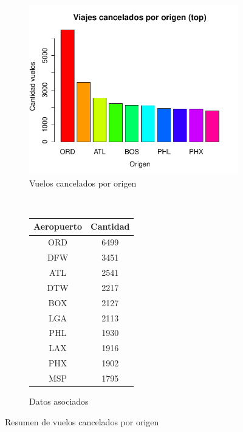 \documentclass[12pt]{article}
\numberwithin{equation}{section}
\numberwithin{table}{section}
\numberwithin{figure}{section}
\begin{document}
\begin{figure}
        \centering
        ~
        \begin{subfigure}[b]{0.6\textwidth}
                \includegraphics[width=1\columnwidth]{imagenes/cancelados/viajes-cancelados-por-origen-top}
                \caption{Vuelos cancelados por origen}
        \end{subfigure}
        ~
        \begin{subfigure}[b]{0.3\textwidth}
                \begin{tabular}{@{}cc@{}}
                  \toprule
                  \textbf{Aeropuerto} & \textbf{Cantidad} \\ \midrule
                  ORD                 & 6499              \\
                  DFW                 & 3451              \\
                  ATL                 & 2541              \\
                  DTW                 & 2217              \\
                  BOX                 & 2127              \\
                  LGA                 & 2113              \\
                  PHL                 & 1930              \\
                  LAX                 & 1916              \\
                  PHX                 & 1902              \\
                  MSP                 & 1795              \\ \bottomrule
                  \end{tabular}
                \caption{Datos asociados}
        \end{subfigure}
        \caption{Resumen de vuelos cancelados por origen}
        \label{fig:cancelados-por-origen}
\end{figure}
\end{document}
